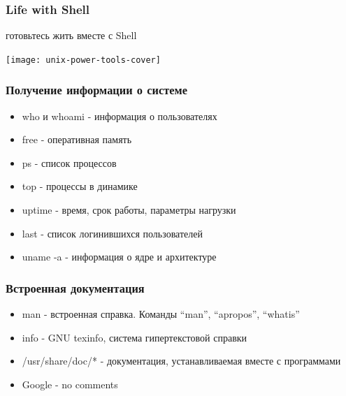 \begin{frame}
  \frametitle{Life with Shell}

  \begin{center}
    \Large{готовьтесь жить вместе с Shell}
    \newline
    
    \texttt{[image: unix-power-tools-cover]} 
  \end{center}

\end{frame}

\begin{frame}
  \frametitle{Получение информации о системе}
  \begin{itemize}
    \item \Large{who} и \Large{whoami} - информация о пользователях \pause
    \item \Large{free} - оперативная память \pause
    \item \Large{ps} - список процессов \pause
    \item \Large{top} - процессы в динамике \pause
    \item \Large{uptime} - время, срок работы, параметры нагрузки \pause
    \item \Large{last} - список логинившихся пользователей \pause
    \item \Large{uname -a} - информация о ядре и архитектуре
  \end{itemize}
\end{frame}

\begin{frame}
  \frametitle{Встроенная документация}
  \begin{itemize}
    \item \Large{man} - встроенная справка. Команды ``man'', ``apropos'', ``whatis'' \pause
    \item info - GNU texinfo, система гипертекстовой справки \pause
    \item /usr/share/doc/* - документация, устанавливаемая вместе с программами \pause
    \item Google - no comments \pause
  \end{itemize}

\end{frame}



